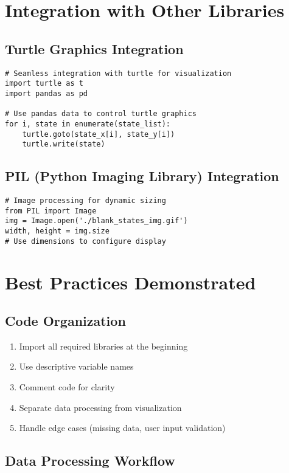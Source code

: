 \documentclass[12pt]{article}
\begin{document}
\section{Integration with Other Libraries}

\subsection{Turtle Graphics Integration}

\begin{lstlisting}
# Seamless integration with turtle for visualization
import turtle as t
import pandas as pd

# Use pandas data to control turtle graphics
for i, state in enumerate(state_list):
    turtle.goto(state_x[i], state_y[i])
    turtle.write(state)
\end{lstlisting}

\subsection{PIL (Python Imaging Library) Integration}

\begin{lstlisting}
# Image processing for dynamic sizing
from PIL import Image
img = Image.open('./blank_states_img.gif')
width, height = img.size
# Use dimensions to configure display
\end{lstlisting}

\section{Best Practices Demonstrated}

\subsection{Code Organization}

\begin{enumerate}
    \item Import all required libraries at the beginning
    \item Use descriptive variable names
    \item Comment code for clarity
    \item Separate data processing from visualization
    \item Handle edge cases (missing data, user input validation)
\end{enumerate}

\subsection{Data Processing Workflow}
\end{document}
